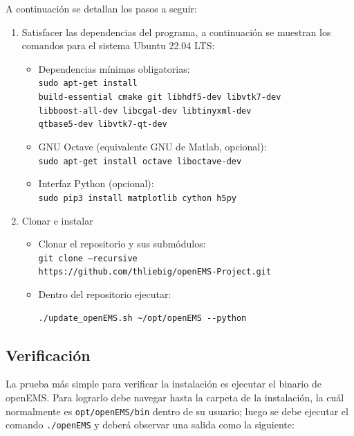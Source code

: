 \documentclass[
    11pt,
    spanish,
    a4paper
]{article}
\begin{document}
A continuación se detallan los pasos a seguir:

\begin{enumerate}
  \item Satisfacer las dependencias del programa, a continuación se muestran los
    comandos para el sistema Ubuntu 22.04 LTS:
    \begin{itemize}
      \item Dependencias mínimas obligatorias:\\
        \texttt{sudo apt-get install\\
        build-essential cmake git libhdf5-dev libvtk7-dev\\
        libboost-all-dev libcgal-dev libtinyxml-dev\\
        qtbase5-dev libvtk7-qt-dev}
      \item GNU Octave (equivalente GNU de Matlab, opcional):\\
        \texttt{sudo apt-get install octave liboctave-dev}
      \item Interfaz Python (opcional):\\
        \texttt{sudo pip3 install matplotlib cython h5py}
    \end{itemize}
  \item Clonar e instalar
    \begin{itemize}
      \item Clonar el repositorio y sus submódulos:\\
        \texttt{git clone --recursive\\
          https://github.com/thliebig/openEMS-Project.git}
      \item Dentro del repositorio ejecutar:
        \begin{verbatim}
./update_openEMS.sh ~/opt/openEMS --python
        \end{verbatim}
    \end{itemize}
\end{enumerate}

\subsection{Verificación}
\label{sub:overificacion}

La prueba más simple para verificar la instalación es ejecutar el binario de
openEMS.
Para lograrlo debe navegar hasta la carpeta de la instalación, la cuál
normalmente es \texttt{opt/openEMS/bin} dentro de su usuario; luego se debe ejecutar
el comando \texttt{./openEMS} y deberá observar una salida como la siguiente:
\end{document}
